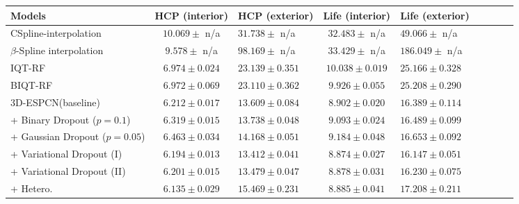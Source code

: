 \begin{table}
	\center
	\footnotesize
	\begin{tabular}{@{}lclclclcl}
		\hline
		Models & HCP (interior) & HCP (exterior)& Life (interior) & Life (exterior)   \\ 
		\hline	
		CSpline-interpolation & $10.069 \pm$ n/a & $31.738\pm$ n/a & $32.483\pm$ n/a & $49.066\pm$ n/a  \\
		$\beta$-Spline interpolation& $9.578\pm$ n/a  & $98.169\pm$ n/a &$33.429\pm$ n/a &$186.049\pm$ n/a   \\
		IQT-RF & $ 6.974 \pm 0.024$  & $23.139\pm0.351$ & $10.038\pm0.019$&$25.166\pm0.328$   \\ 
		BIQT-RF & $6.972 \pm 0.069$  &$23.110\pm0.362$  & $9.926\pm0.055$ &$25.208\pm0.290$ \\
		\hline 
		3D-ESPCN(baseline)                      & $6.212\pm0.017$    & $13.609\pm0.084$  &$8.902\pm0.020$   &$16.389\pm0.114$\\
		+ Binary Dropout ($p=0.1$)           & $6.319 \pm 0.015$  & $13.738\pm0.048$   &$9.093\pm0.024$  &$16.489\pm0.099$ \\
		+ Gaussian Dropout ($p=0.05$)     & $6.463\pm0.034$    & $14.168\pm0.051$  &$9.184\pm0.048$  & $16.653\pm0.092$\\
		
		+ Variational Dropout (I)                  & $6.194\pm0.013$    & \cellcolor{red!15} $\mathbf{13.412\pm 0.041}$   &$8.874\pm0.027$  &  \cellcolor{red!15} $\mathbf{16.147\pm0.051}$ \\
		+ Variational Dropout (II)                 & $6.201\pm0.015$    & \cellcolor{blue!15}  $13.479\pm0.047$   & $8.878\pm0.031$  &\cellcolor{blue!15} $16.230\pm0.075$ \\
		
		+ Hetero.                                        & $6.135\pm0.029 $   & $15.469\pm 0.231$  & $8.885\pm0.041$ & $17.208\pm0.211$ \\
		

\end{tabular}
\end{table}
